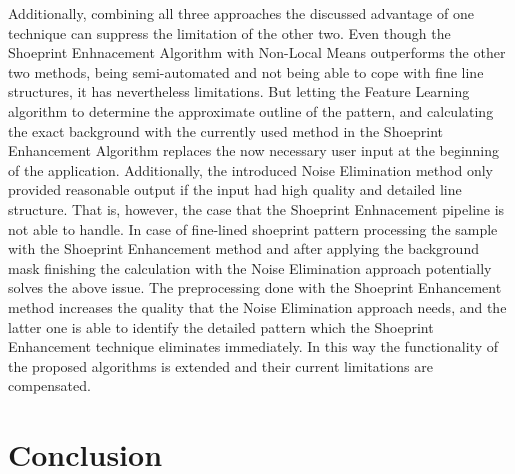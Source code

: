 \documentclass[draft,final]{vutinfth} %
\begin{document}
Additionally, combining all three approaches the discussed advantage of one technique can suppress the limitation of the other two.
Even though the Shoeprint Enhnacement Algorithm with Non-Local Means outperforms the other two methods, being semi-automated and not being able to cope with fine line structures, it has nevertheless limitations. 
But letting the Feature Learning algorithm to determine the approximate outline of the pattern, and calculating the exact background with the currently used method in the Shoeprint Enhancement Algorithm replaces the now necessary user input at the beginning of the application.
Additionally, the introduced Noise Elimination method only provided reasonable output if the input had high quality and detailed line structure.
That is, however, the case that the Shoeprint Enhnacement pipeline is not able to handle. 
In case of fine-lined shoeprint pattern processing the sample with the Shoeprint Enhancement method and after applying the background mask finishing the calculation with the Noise Elimination approach potentially solves the above issue.
The preprocessing done with the Shoeprint Enhancement method increases the quality that the Noise Elimination approach needs, and the latter one is able to identify the detailed pattern which the Shoeprint Enhancement technique eliminates immediately.
In this way the functionality of the proposed algorithms is extended and their current limitations are compensated.


\chapter{Conclusion}
\end{document}
